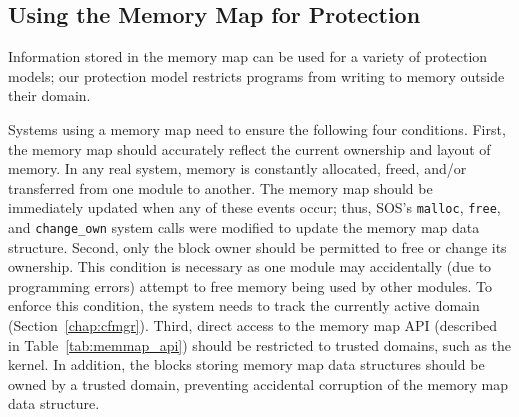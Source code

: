 \subsection{Using the Memory Map for Protection}
\label{sec:mmap_for_protection}
%
Information stored in the memory map can be used for a variety of protection models;
%
our protection model restricts programs from writing to memory outside their domain.
%
%


%
Systems using a memory map need to ensure the following four conditions.
%
First, the memory map should accurately reflect the current ownership and
layout of memory.
%
In any real system, memory is constantly allocated, freed, and/or
transferred from one module to another.
%
The memory map should be immediately updated when any of these events
occur; thus, SOS's
%
\texttt{malloc}, \texttt{free}, and
\texttt{change\_own} system calls were modified to update the memory
map data structure. 
%
Second, only the block owner should be permitted to free or change its ownership.
%
This condition is necessary as one module may accidentally (due to
programming errors) attempt to free memory being used by other
modules.
%
%
To enforce this condition, the system needs to track the currently
active domain (Section~\ref{chap:cfmgr}).
%
%
Third, direct access to the memory map API (described in Table~\ref{tab:memmap_api})
should be restricted to trusted domains, such as the kernel.
%
%
%
In addition, the blocks storing memory map data structures should be owned
by a trusted domain, preventing
%
accidental corruption of the memory map data structure.
%



